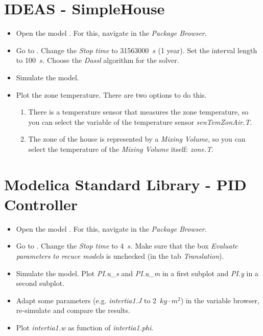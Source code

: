 \documentclass[10pt,a4paper]{article}
\begin{document}
\newpage

\section{IDEAS - SimpleHouse}

\begin{itemize}
	\item Open the model . For this, navigate in the \textit{Package Browser}.
	\item Go to . Change the \textit{Stop time} to 31563000~$s$ (1 year). Set the interval length to 100~$s$. Choose the \textit{Dassl} algorithm for the solver.
	\item Simulate the model.
	\item Plot the zone temperature. There are two options to do this. 
	\begin{enumerate}
		\item There is a temperature sensor that measures the zone temperature, so you can select the variable of the temperature sensor \textit{senTemZonAir.T}.
		\item The zone of the house is represented by a \textit{Mixing Volume}, so you can select the temperature of the \textit{Mixing Volume} itself: \textit{zone.T}.
	\end{enumerate}
\end{itemize}

\section{Modelica Standard Library - PID Controller}

\begin{itemize}
	\item Open the model . For this, navigate in the \textit{Package Browser}.
	\item Go to . Change the \textit{Stop time} to 4~$s$. Make sure that the box \textit{Evaluate parameters to recuce models} is unchecked (in the tab \textit{Translation}).
	\item Simulate the model. Plot \textit{PI.u\_s} and \textit{PI.u\_m} in a first subplot and \textit{PI.y} in a second subplot.
	\item Adapt some parameters (e.g. \textit{intertia1.J} to 2~$kg \cdot m^2$) in the variable browser, re-simulate and compare the results.
	\item Plot \textit{intertia1.w} as function of \textit{intertia1.phi}.
\end{itemize}
\end{document}
